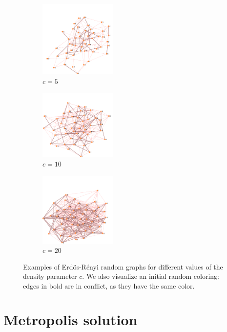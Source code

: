 \documentclass{report}
\begin{document}
  \begin{figure}
      \centering
      \begin{subfigure}[t]{3.8cm}
        \centering
        \includegraphics[width=3.8cm]{figures/random-graph-50-5-5.pdf}
        \caption{$c = 5$}\label{fig:1a}
      \end{subfigure}
      \begin{subfigure}[t]{3.8cm}
        \centering
        \includegraphics[width=3.8cm]{figures/random-graph-50-10-5.pdf}
        \caption{$c = 10$}\label{fig:1a}
      \end{subfigure}
      \quad
      \begin{subfigure}[t]{3.8cm}
        \centering
        \includegraphics[width=3.8cm]{figures/random-graph-50-20-5.pdf}
        \caption{$c = 20$}\label{fig:1b}
      \end{subfigure}

    \label{Fig:random-graph-examples}
    \caption{Examples of Erd\"{o}s-R\'{e}nyi random graphs for different values of the density parameter $c$. We also visualize an initial random coloring: edges in bold are in conflict, as they have the same color.}
  \end{figure}

  \section*{Metropolis solution}
\end{document}
